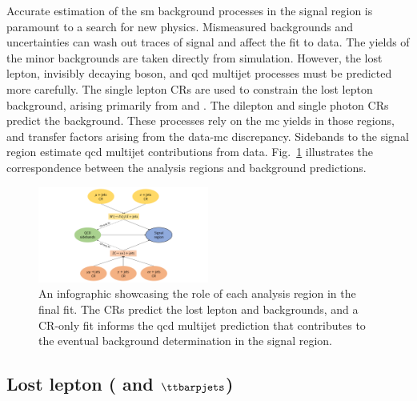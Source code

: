 
Accurate estimation of the \acrlong{sm} background processes in the signal region is paramount to a search for new physics. Mismeasured backgrounds and uncertainties can wash out traces of signal and affect the fit to data. The yields of the minor backgrounds are taken directly from simulation. However, the lost lepton, invisibly decaying \PZ boson, and \acrshort{qcd} multijet processes must be predicted more carefully. The single lepton \glspl{CR} are used to constrain the lost lepton background, arising primarily from \ttbarpjets and \wtolnupjets. The dilepton and single photon \glspl{CR} predict the \ztonunupjets background. These processes rely on the \acrlong{mc} yields in those regions, and transfer factors arising from the data-\acrshort{mc} discrepancy. Sidebands to the signal region estimate \acrshort{qcd} multijet contributions from data. Fig.~\ref{fig:htoinv_fit_overview} illustrates the correspondence between the analysis regions and background predictions.

\begin{figure}[htbp]
    \centering
    \includegraphics[width=0.5\textwidth]{figures/fit_overview.pdf}
    \caption[An infographic showcasing the role of each analysis region in the final fit]{An infographic showcasing the role of each analysis region in the final fit. The \glspl{CR} predict the lost lepton and \ztonunu backgrounds, and a \gls{CR}-only fit informs the \acrshort{qcd} multijet prediction that contributes to the eventual background determination in the signal region.}
    \label{fig:htoinv_fit_overview}
\end{figure}




\subsection{Lost lepton (\texorpdfstring{\PW}{W} and \texorpdfstring{$\ttbarpjets$}{ttbar plus jets})}
\label{subsec:htoinv_lost_lepton_bkg}


